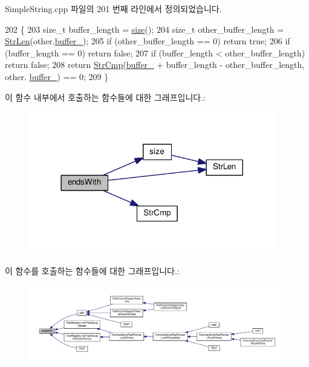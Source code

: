 Simple\+String.\+cpp 파일의 201 번째 라인에서 정의되었습니다.


\begin{DoxyCode}
202 \{
203     \textcolor{keywordtype}{size\_t} buffer\_length = \hyperlink{class_simple_string_aac782da1f912bceb5d8ad00c8dc892ac}{size}();
204     \textcolor{keywordtype}{size\_t} other\_buffer\_length = \hyperlink{class_simple_string_a867ba0eaff866a8b87c33ece7e09a8fa}{StrLen}(other.\hyperlink{class_simple_string_a37525d5cfe40669bc9ca14b3234c70d2}{buffer\_});
205     \textcolor{keywordflow}{if} (other\_buffer\_length == 0) \textcolor{keywordflow}{return} \textcolor{keyword}{true};
206     \textcolor{keywordflow}{if} (buffer\_length == 0) \textcolor{keywordflow}{return} \textcolor{keyword}{false};
207     \textcolor{keywordflow}{if} (buffer\_length < other\_buffer\_length) \textcolor{keywordflow}{return} \textcolor{keyword}{false};
208     \textcolor{keywordflow}{return} \hyperlink{class_simple_string_a0b7a8ae895cbde84a491b42c43de23a6}{StrCmp}(\hyperlink{class_simple_string_a37525d5cfe40669bc9ca14b3234c70d2}{buffer\_} + buffer\_length - other\_buffer\_length, other.
      \hyperlink{class_simple_string_a37525d5cfe40669bc9ca14b3234c70d2}{buffer\_}) == 0;
209 \}
\end{DoxyCode}


이 함수 내부에서 호출하는 함수들에 대한 그래프입니다.\+:
\nopagebreak
\begin{figure}[H]
\begin{center}
\leavevmode
\includegraphics[width=305pt]{class_simple_string_a96b82881ce1d49cee9ee0585bdf45ffb_cgraph}
\end{center}
\end{figure}




이 함수를 호출하는 함수들에 대한 그래프입니다.\+:
\nopagebreak
\begin{figure}[H]
\begin{center}
\leavevmode
\includegraphics[width=350pt]{class_simple_string_a96b82881ce1d49cee9ee0585bdf45ffb_icgraph}
\end{center}
\end{figure}


